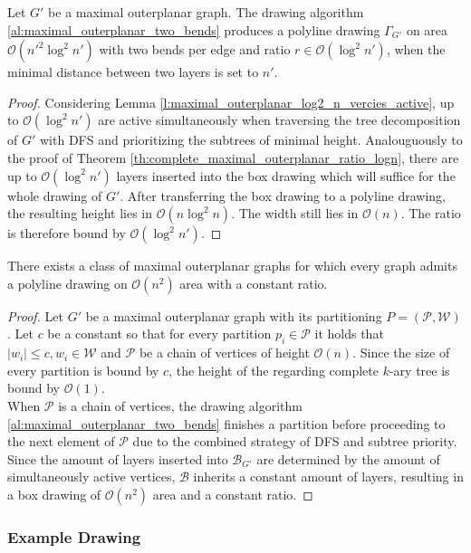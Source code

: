 \begin{theorem}
	Let $G'$ be a maximal outerplanar graph. The drawing algorithm \ref{al:maximal_outerplanar_two_bends} produces a polyline drawing $\Gamma_{G'}$ on area $\mathcal{O}(n'^2 \log^2 n')$ with two bends per edge and ratio $r \in \mathcal{O}(\log^2 n')$, when the minimal distance between two layers is set to $n'$.\label{th:maximal_outerplanar_log2_n_ratio}
\end{theorem}
\begin{proof}
	Considering Lemma \ref{l:maximal_outerplanar_log2_n_vercies_active}, up to $\mathcal{O}(\log^2 n')$ are active simultaneously when traversing the tree decomposition of $G'$ with DFS and prioritizing the subtrees of minimal height. Analouguously to the proof of Theorem \ref{th:complete_maximal_outerplanar_ratio_logn}, there are up to $\mathcal{O}(\log^2 n')$ layers inserted into the box drawing which will suffice for the whole drawing of $G'$. After transferring the box drawing to a polyline drawing, the resulting height lies in $\mathcal{O}(n\log^2 n)$. The width still lies in $\mathcal{O}(n)$. The ratio is therefore bound by $\mathcal{O}
	(\log^2 n')$. 
\end{proof}

\begin{theorem}
	There exists a class of maximal outerplanar graphs for which every graph admits a polyline drawing on $\mathcal{O}(n^2)$ area with a constant ratio.
\end{theorem}
\begin{proof}
	Let $G'$ be a maximal outerplanar graph with its partitioning $P = (\mathcal{P},\mathcal{W})$. Let $c$ be a constant so that for every partition $p_i \in \mathcal{P}$ it holds that $|w_i|\leq c, w_i \in \mathcal{W}$ and $\mathcal{P}$ be a chain of vertices of height $\mathcal{O}(n)$. Since the size of every partition is bound by $c$, the height of the regarding complete $k$-ary tree is bound by $\mathcal{O}(1)$.\\
	When $\mathcal{P}$ is a chain of vertices, the drawing algorithm \ref{al:maximal_outerplanar_two_bends} finishes a partition before proceeding to the next element of $\mathcal{P}$ due to the combined strategy of DFS and subtree priority. Since the amount of layers inserted into $\mathcal{B}_{G'}$ are determined by the amount of simultaneously active vertices, $\mathcal{B}$ inherits a constant amount of layers, resulting in a box drawing of $\mathcal{O}(n^2)$ area and a constant ratio.
\end{proof}
\newpage
\subsubsection{Example Drawing}

